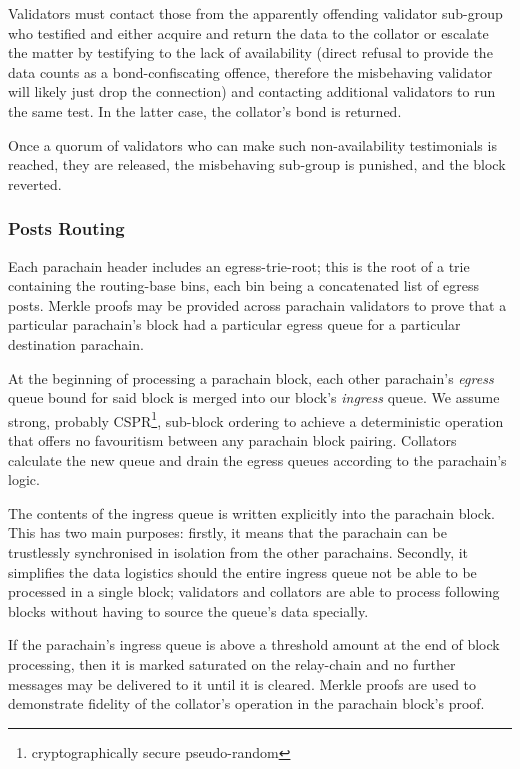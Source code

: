 \documentclass[9pt,oneside]{amsart}
\begin{document}
\begin{multicols}{2}
 Validators must contact those from the apparently offending validator sub-group who testified and either acquire and return the data to the collator or escalate the matter by testifying to the lack of availability (direct refusal to provide the data counts as a bond-confiscating offence, therefore the misbehaving validator will likely just drop the connection) and contacting additional validators to run the same test. In the latter case, the collator's bond is returned.

 Once a quorum of validators who can make such non-availability testimonials is reached, they are released, the misbehaving sub-group is punished, and the block reverted.

\subsubsection{Posts Routing}
\label{posts-routing}

 Each parachain header includes an egress-trie-root; this is the root of a trie containing the routing-base bins, each bin being a concatenated list of egress posts. Merkle proofs may be provided across parachain validators to prove that a particular parachain's block had a particular egress queue for a particular destination parachain.

 At the beginning of processing a parachain block, each other parachain's \textit{egress} queue bound for said block is merged into our block's \textit{ingress} queue. We assume strong, probably CSPR\footnote{cryptographically secure pseudo-random}, sub-block ordering to achieve a deterministic operation that offers no favouritism between any parachain block pairing. Collators calculate the new queue and drain the egress queues according to the parachain's logic.

 The contents of the ingress queue is written explicitly into the parachain block. This has two main purposes: firstly, it means that the parachain can be trustlessly synchronised in isolation from the other parachains. Secondly, it simplifies the data logistics should the entire ingress queue not be able to be processed in a single block; validators and collators are able to process following blocks without having to source the queue's data specially.

 If the parachain's ingress queue is above a threshold amount at the end of block processing, then it is marked saturated on the relay-chain and no further messages may be delivered to it until it is cleared. Merkle proofs are used to demonstrate fidelity of the collator's operation in the parachain block's proof.


\end{multicols}
\end{document}
